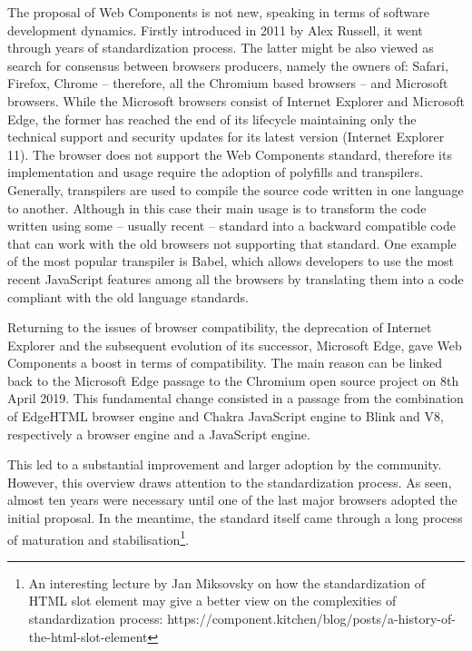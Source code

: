 The proposal of Web Components is not new, speaking in terms of software development dynamics. Firstly introduced in 2011 by Alex Russell, it went through years of standardization process. The latter might be also viewed as search for consensus between browsers producers, namely the owners of: Safari, Firefox, Chrome – therefore, all the Chromium based browsers – and Microsoft browsers. While the Microsoft browsers consist of Internet Explorer and Microsoft Edge, the former has reached the end of its lifecycle maintaining only the technical support and security updates for its latest version (Internet Explorer 11). The browser does not support the Web Components standard, therefore its implementation and usage require the adoption of polyfills and transpilers.
Generally, transpilers are used to compile the source code written in one language to another. Although in this case their main usage is to transform the code written using some – usually recent – standard into a backward compatible code that can work with the old browsers not supporting that standard. One example of the most popular transpiler is Babel, which allows developers to use the most recent JavaScript features among all the browsers by translating them into a code compliant with the old language standards.


Returning to the issues of browser compatibility, the deprecation of Internet Explorer and the subsequent evolution of its successor, Microsoft Edge, gave Web Components a boost in terms of compatibility. The main reason can be linked back to the Microsoft Edge passage to the Chromium open source project on 8th April 2019. This fundamental change consisted in a passage from the combination of EdgeHTML browser engine and Chakra JavaScript engine to Blink and V8, respectively a browser engine and a JavaScript engine.

This led to a substantial improvement and larger adoption by the community. However, this overview draws attention to the standardization process. As seen, almost ten years were necessary until one of the last major browsers adopted the initial proposal. In the meantime, the standard itself came through a long process of maturation and stabilisation\footnote{An interesting lecture by Jan Miksovsky on how the standardization of HTML slot element may give a better view on the complexities of standardization process: https://component.kitchen/blog/posts/a-history-of-the-html-slot-element}.

